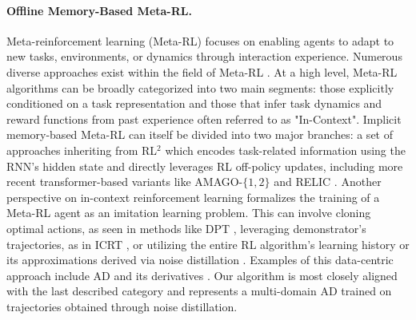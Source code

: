 \documentclass{article}
\theoremstyle{plain}
\theoremstyle{definition}
\theoremstyle{remark}
\begin{document}
\paragraph{Offline Memory-Based Meta-RL.} Meta-reinforcement learning (Meta-RL) focuses on enabling agents to adapt to new tasks, environments, or dynamics through interaction experience. Numerous diverse approaches exist within the field of Meta-RL \cite{beck2024surveymetareinforcementlearning}. At a high level, Meta-RL algorithms can be broadly categorized into two main segments: those explicitly conditioned on a task representation \cite{espeholt2018impalascalabledistributeddeeprl, DBLP:journals/corr/abs-1903-08254, DBLP:journals/corr/abs-2010-13957, sodhani2021multitaskreinforcementlearningcontextbased} and those that infer task dynamics and reward functions from past experience often referred to as "In-Context". Implicit memory-based Meta-RL can itself be divided into two major branches: a set of approaches inheriting from RL$^2$ \cite{DBLP:journals/corr/DuanSCBSA16} which encodes task-related information using the RNN's hidden state and directly leverages RL off-policy updates, including more recent transformer-based variants like AMAGO-$\{1,2\}$ \cite{grigsby2024amagoscalableincontextreinforcement, grigsby2024amago2breakingmultitaskbarrier} and RELIC \cite{elawady2024relicrecipe64ksteps}. Another perspective on in-context reinforcement learning formalizes the training of a Meta-RL agent as an imitation learning problem. This can involve cloning optimal actions, as seen in methods like DPT \cite{lee2023supervisedpretraininglearnincontext}, leveraging demonstrator's trajectories, as in ICRT \cite{fu2024incontextimitationlearningnexttoken}, or utilizing the entire RL algorithm's learning history or its approximations derived via noise distillation \cite{zisman2024emergenceincontextreinforcementlearning}. Examples of this data-centric approach include AD and its derivatives \cite{laskin2022incontextreinforcementlearningalgorithm, kirsch2023towards, sinii2024incontextreinforcementlearningvariable, nikulin2024xland100blargescalemultitaskdataset}. Our algorithm is most closely aligned with the last described category and represents a multi-domain AD trained on trajectories obtained through noise distillation.
\end{document}
